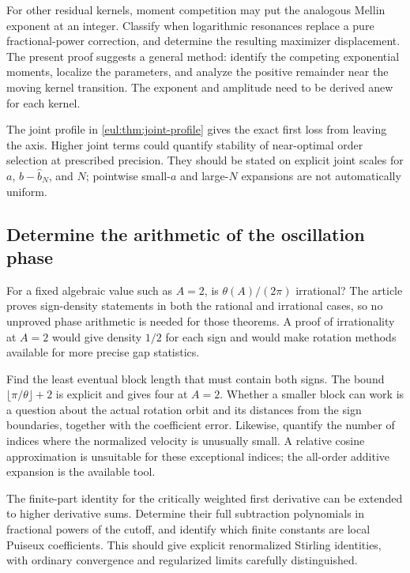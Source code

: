 \documentclass[11pt]{article}
\numberwithin{equation}{section}
\theoremstyle{definition}
\theoremstyle{remark}
\begin{document}
For other residual kernels, moment competition may put the analogous
Mellin exponent at an integer. Classify when logarithmic resonances
replace a pure fractional-power correction, and determine the resulting
maximizer displacement. The present proof suggests a general method:
identify the competing exponential moments, localize the parameters,
and analyze the positive remainder near the moving kernel transition.
The exponent and amplitude need to be derived anew for each kernel.

The joint profile in \cref{eul:thm:joint-profile} gives the exact first
loss from leaving the axis. Higher joint terms could quantify stability
of near-optimal order selection at prescribed precision. They should
be stated on explicit joint scales for $a$, $b-\widehat b_N$, and $N$;
pointwise small-$a$ and large-$N$ expansions are not automatically uniform.

\subsection{Determine the arithmetic of the oscillation phase}

For a fixed algebraic value such as $A=2$, is
$\theta(A)/(2\pi)$ irrational? The article proves sign-density
statements in both the rational and irrational cases, so no unproved
phase arithmetic is needed for those theorems. A proof of irrationality
at $A=2$ would give density $1/2$ for each sign and would make rotation
methods available for more precise gap statistics.

Find the least eventual block length that must contain both signs.
The bound $\lfloor\pi/\theta\rfloor+2$ is explicit and gives four at
$A=2$. Whether a smaller block can work is a question about the actual
rotation orbit and its distances from the sign boundaries, together
with the coefficient error. Likewise, quantify the number of indices
where the normalized velocity is unusually small. A relative cosine
approximation is unsuitable for these exceptional indices; the
all-order additive expansion is the available tool.

The finite-part identity for the critically weighted first derivative
can be extended to higher derivative sums. Determine their full
subtraction polynomials in fractional powers of the cutoff, and
identify which finite constants are local Puiseux coefficients.
This should give explicit renormalized Stirling identities, with
ordinary convergence and regularized limits carefully distinguished.
\end{document}
